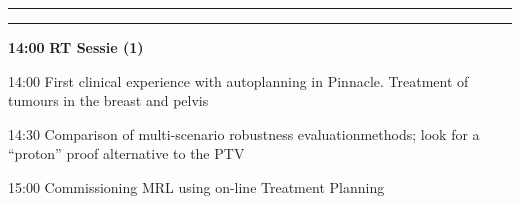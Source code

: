 \documentclass[a4paper,10pt]{report}
\begin{document}
\begin{multicols*}{3}




\vfill
\vspace{4cm}

\strut
\columnbreak

\hrule \vspace{2mm}
\vspace{2mm}\hrule\strut

\begin{packed_enum}
\item[\textbf{14:00}] \textbf{RT Sessie (1)}
\item[14:00] First clinical experience with autoplanning in Pinnacle. Treatment of tumours in the breast and pelvis
\item[14:30] Comparison of multi-scenario robustness evaluationmethods; look for a ``proton'' proof alternative to the PTV
\item[15:00] Commissioning MRL using on-line Treatment Planning
\end{packed_enum} %

\vfill 


\end{multicols*}
\end{document}
